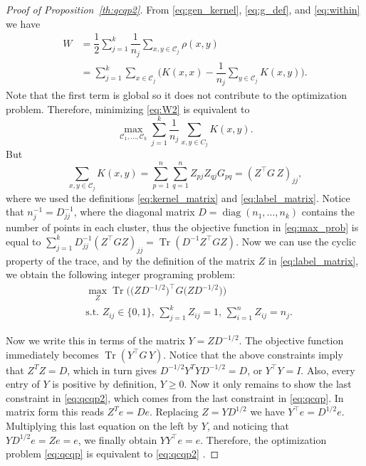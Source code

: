 \documentclass{article}
\DeclareMathOperator{\diag}{diag}
\DeclareMathOperator{\Tr}{Tr}
\newcommand\kk{K}
\newcommand\C{{\mathcal{C}}}
\newcommand\e{e}
\begin{document}
\begin{proof}[Proof of Proposition~\ref{th:qcqp2}]
From 
\eqref{eq:gen_kernel},
\eqref{eq:g_def}, and
\eqref{eq:within}
we have
\begin{equation}
\label{eq:W2}
\begin{split}
W
&= \dfrac{1}{2} \sum_{j=1}^k \dfrac{1}{n_j} \sum_{x,y \in \C_j} \rho(x,y) \\
&= \sum_{j=1}^k \sum_{x \in \C_j}  \bigg(
\kk(x,x) - \dfrac{1}{n_j} \sum_{y \in \C_j} \kk(x,y) \bigg).
\end{split}
\end{equation}
Note that the first term is global so it does not contribute to the 
optimization problem.
Therefore, minimizing \eqref{eq:W2} is equivalent to
\begin{equation}
\label{eq:max_prob}
\max_{ \C_1,\dotsc,\C_k } 
\sum_{j=1}^k \dfrac{1}{n_j} \sum_{x,y\in C_j} \kk(x,y) .
\end{equation}
But 
\begin{equation}
\sum_{x, y \in \C_j} \kk(x, y) =
\sum_{p=1}^{n} \sum_{q=1}^{n} Z_{pj} Z_{qj} G_{pq} = 
(Z^\top G \, Z)_{jj},
\end{equation}
where we used the definitions \eqref{eq:kernel_matrix} and
\eqref{eq:label_matrix}. 
Notice that $n_j^{-1} = D^{-1}_{jj}$, where the diagonal matrix $D = 
\diag(n_1,\dotsc,n_k)$ contains the number of points in each cluster, 
thus the objective function in 
\eqref{eq:max_prob} is equal to $\sum_{j=1}^k D^{-1}_{jj} 
\left( Z^\top G Z \right)_{jj} = \Tr \left( D^{-1} Z^\top G Z \right)$. 
Now we can
use the cyclic property
of the trace, and by the  definition of the matrix $Z$
in \eqref{eq:label_matrix}, we obtain the following integer
programing problem:
\begin{equation}\label{eq:qcqp}
\begin{split}
&\max_{Z} \Tr\Big( \big( Z D^{-1/2}\big)^\top G 
\big( ZD^{-1/2} \big) 
\Big) \\
&\mbox{s.t. $Z_{ij} \in \{0,1\}$, $\sum_{j=1}^k Z_{ij} = 1$, 
$\sum_{i=1}^n Z_{ij} = n_j$.}
\end{split}
\end{equation}

Now we write this in terms of the matrix $Y = Z D^{-1/2}$.
The objective function immediately becomes
$\Tr\left( Y^\top G \, Y\right)$. Notice that the above constraints
imply that $Z^T Z = D$, which in turn gives
$D^{-1/2} Y^T Y D^{-1/2} = D$, or $Y^\top Y = I$. 
Also, every entry of $Y$ is positive by definition,
$Y \ge 0$. Now it only remains to show the last 
constraint in \eqref{eq:qcqp2}, which comes from the last
constraint in \eqref{eq:qcqp}. In matrix form this reads
$Z^T \e = D \e$. Replacing $Z=YD^{1/2}$ we have
$Y^\top \e = D^{1/2} \e$. Multiplying this last equation
on the left by $Y$, and noticing
that $Y D^{1/2} \e = Z \e = \e$, we finally obtain
$Y Y^\top \e = \e$. Therefore, the optimization 
problem \eqref{eq:qcqp} is equivalent
to \eqref{eq:qcqp2} .
\end{proof}
\end{document}
